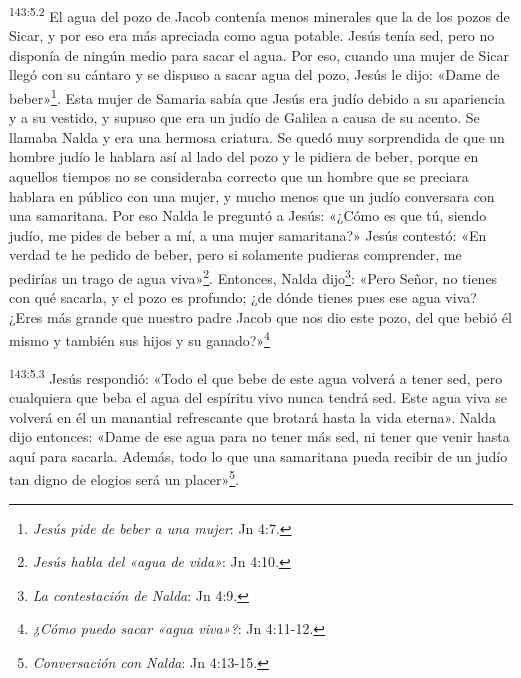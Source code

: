 \par 
\textsuperscript{143:5.2} El agua del pozo de Jacob contenía menos minerales que la de los pozos de Sicar, y por eso era más apreciada como agua potable. Jesús tenía sed, pero no disponía de ningún medio para sacar el agua. Por eso, cuando una mujer de Sicar llegó con su cántaro y se dispuso a sacar agua del pozo, Jesús le dijo: «Dame de beber»\footnote{\textit{Jesús pide de beber a una mujer}: Jn 4:7.}. Esta mujer de Samaria sabía que Jesús era judío debido a su apariencia y a su vestido, y supuso que era un judío de Galilea a causa de su acento. Se llamaba Nalda y era una hermosa criatura. Se quedó muy sorprendida de que un hombre judío le hablara así al lado del pozo y le pidiera de beber, porque en aquellos tiempos no se consideraba correcto que un hombre que se preciara hablara en público con una mujer, y mucho menos que un judío conversara con una samaritana. Por eso Nalda le preguntó a Jesús: «¿Cómo es que tú, siendo judío, me pides de beber a mí, a una mujer samaritana?» Jesús contestó: «En verdad te he pedido de beber, pero si solamente pudieras comprender, me pedirías un trago de agua viva»\footnote{\textit{Jesús habla del «agua de vida»}: Jn 4:10.}. Entonces, Nalda dijo\footnote{\textit{La contestación de Nalda}: Jn 4:9.}: «Pero Señor, no tienes con qué sacarla, y el pozo es profundo; ¿de dónde tienes pues ese agua viva? ¿Eres más grande que nuestro padre Jacob que nos dio este pozo, del que bebió él mismo y también sus hijos y su ganado?»\footnote{\textit{¿Cómo puedo sacar «agua viva»?}: Jn 4:11-12.}

\par 
\textsuperscript{143:5.3} Jesús respondió: «Todo el que bebe de este agua volverá a tener sed, pero cualquiera que beba el agua del espíritu vivo nunca tendrá sed. Este agua viva se volverá en él un manantial refrescante que brotará hasta la vida eterna». Nalda dijo entonces: «Dame de ese agua para no tener más sed, ni tener que venir hasta aquí para sacarla. Además, todo lo que una samaritana pueda recibir de un judío tan digno de elogios será un placer»\footnote{\textit{Conversación con Nalda}: Jn 4:13-15.}.


